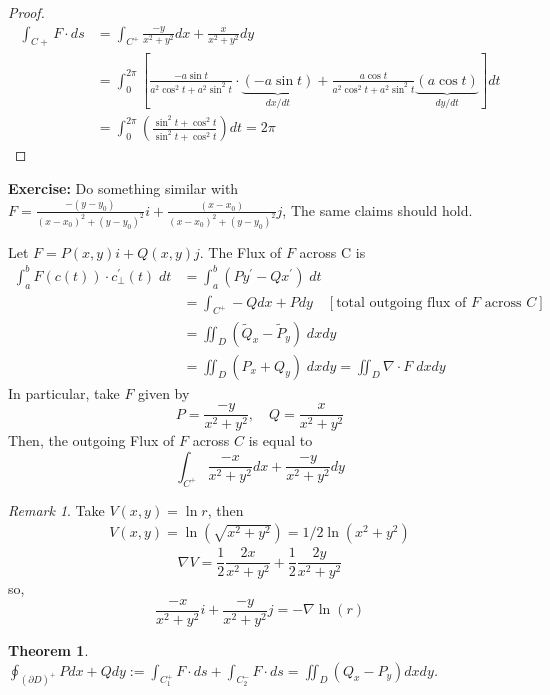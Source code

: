 \documentclass[12pt]{book}
\newtheorem{theorem}{Theorem}[section]
\theoremstyle{definition}
\theoremstyle{remark}
\newtheorem*{remark}{Remark}
\begin{document}
\begin{example}
\begin{proof}
      \begin{equation*}
        \begin{split}
          \int_{C+} F \cdot ds &= \int_{C^+} \frac{-y}{x^2 + y^2} dx + \frac{x}{x^2 + y^2} dy \\ 
          &= \int_0^{2 \pi} \left[ \frac{-a \sin t }{a^2 \cos^2 t + a^2 \sin^2 t} \cdot \underbrace{(-a \sin t)}_{dx/dt} + \frac{a \cos t}{a^2 \cos^2 t + a^2 \sin^2 t } \underbrace{(a \cos t)}_{dy/dt}  \right] dt \\ 
          &= \int_0^{2\pi} \left( \frac{\sin^2 t + \cos ^2 t}{\sin^2 t + \cos^2 t } \right)dt = 2 \pi 
        \end{split}
      \end{equation*}
    \end{proof}
  \end{example}
  \noindent \textbf{Exercise:} Do something similar with $F = \frac{-(y-y_0)}{(x-x_0)^2 + (y-y_0)^2}i +\frac{(x-x_0)}{(x-x_0)^2 + (y-y_0)^2}j $, The same claims should hold. 
  \begin{example} Let $F = P(x,y)i + Q(x,y)j$. 
    \newline 
    The Flux of $F$ across C is 
    \begin{equation*}
      \begin{split}
        \int_a^b F(c(t))\cdot c_\perp^\prime(t) \; dt &= \int_a^b (P y^\prime - Q x^\prime) \; dt \\ 
        &= \int_{C^+} - Qdx + P dy  \quad [\text{total outgoing flux of $F$ across $C$}]\\
        &= \iint_D ( \tilde Q_x - \tilde P_y) \; dx dy \\ 
        &= \iint_D ( P_x + Q_y ) \; dx dy = \iint_D \nabla \cdot F \; dx dy
      \end{split}
    \end{equation*}
    In particular, take $F$ given by 
    $$P= \frac{-y}{x^2+ y^2} , \quad Q= \frac{x}{x^2 +y^2}$$
    Then, the outgoing Flux of $F$ across $C$ is equal to 
    $$\int_{C^+} \frac{-x}{x^2 + y^2} dx + \frac{-y }{x^2 + y^2 } dy$$
  \end{example}
\begin{remark} 
  Take $V(x,y) = \ln r$, then 
  \begin{equation*}
    \begin{split}
      V(x,y) = \ln (\sqrt{x^2 + y^2} )  = 1/2 \ln (x^2 + y^2)
    \end{split}
  \end{equation*}
  $$  
      \nabla V = \frac{1}{2} \frac{2x}{x^2 + y^2 } + \frac{1}{2} \frac{2y}{x^2+ y^2 } $$
  so, 
  $$\frac{-x}{x^2 + y^2 } i + \frac{-y}{x^2 + y^2 }  j = -\nabla \ln (r) $$
\end{remark}
\begin{theorem} \label{}
  $\oint_{(\partial D)^+} Pdx + Q dy := \int_{C_1^+}F \cdot ds + \int_{C_2^-} F \cdot {ds}= \iint_D (Q_x -P_y)dxdy$.
\end{theorem}
\end{document}
